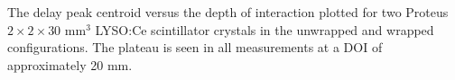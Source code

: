 \label{fig:centroidposition} The delay peak centroid versus the depth of interaction plotted for two Proteus $2\times2\times30$ mm$^3$ LYSO:Ce scintillator crystals in the unwrapped and wrapped configurations. The plateau is seen in all measurements at a DOI of approximately 20 mm.